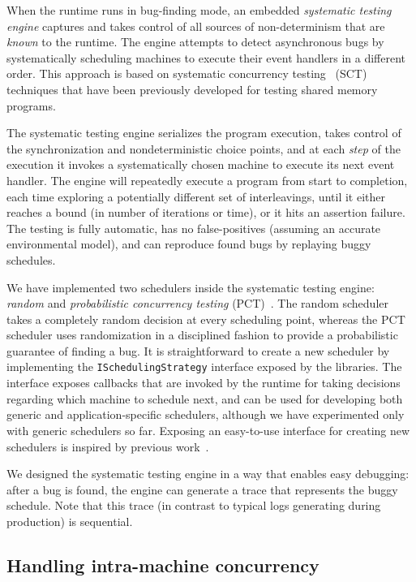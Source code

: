 When the \psharp runtime runs in bug-finding mode, an embedded \emph{systematic testing engine} captures and takes control of all sources of non-determinism that are \emph{known} to the \psharp runtime. The engine attempts to detect asynchronous bugs by systematically scheduling machines to execute their event handlers in a different order. This approach is based on systematic concurrency testing~\cite{godefroid1997verisoft, musuvathi2008finding, emmi2011delay} (SCT) techniques that have been previously developed for testing shared memory programs.

The systematic testing engine serializes the program execution, takes control of the synchronization and nondeterministic choice points, and at each \emph{step} of the execution it invokes a systematically chosen \psharp machine to execute its next event handler. The engine will repeatedly execute a program from start to completion, each time exploring a potentially different set of interleavings, until it either reaches a bound (in number of iterations or time), or it hits an assertion failure. The testing is fully automatic, has no false-positives (assuming an accurate environmental model), and can reproduce found bugs by replaying buggy schedules.

We have implemented two schedulers inside the \psharp systematic testing engine: \emph{random} and \emph{probabilistic concurrency testing} (PCT)~\cite{burckhardt2010pct}. The random scheduler takes a completely random decision at every scheduling point, whereas the PCT scheduler uses randomization in a disciplined fashion to provide a probabilistic guarantee of finding a bug. It is straightforward to create a new scheduler by implementing the \texttt{ISchedulingStrategy} interface exposed by the \psharp libraries. The interface exposes callbacks that are invoked by the \psharp runtime for taking decisions regarding which machine to schedule next, and can be used for developing both generic and application-specific schedulers, although we have experimented only with generic schedulers so far. Exposing an easy-to-use interface for creating new schedulers is inspired by previous work~\cite{DesaiQS15}.

We designed the systematic testing engine in a way that enables easy debugging: after a bug is found, the engine can generate a trace that represents the buggy schedule. Note that this trace (in contrast to typical logs generating during production) is sequential.

\subsection{Handling intra-machine concurrency}
\label{sec:psharp:async}

